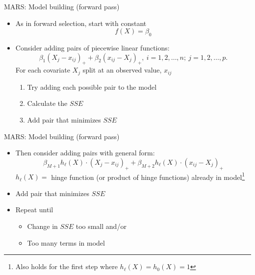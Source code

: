 \documentclass{beamer}
\begin{document}
\begin{frame}{MARS: Model building (forward pass)}
  
  \begin{itemize}[<+->]
    \item As in forward selection, start with constant
    \begin{equation*}
      f(X) = \beta_{0}
    \end{equation*}
    \item Consider adding pairs of piecewise linear functions:
  \begin{equation*}
  \beta_{1} (X_{j} - x_{ij})_{+} + \beta_{2}(x_{ij} - X_{j})_{+}, \ i = 1, 2, \ldots, n; \ j = 1, 2, \ldots, p.
  \end{equation*}
   For each covariate $X_{j}$ split at an observed value, $x_{ij}$
  \begin{enumerate}
    \item Try adding each possible pair to the model
    \item Calculate the $SSE$
    \item Add pair that minimizes $SSE$
  \end{enumerate}
  \end{itemize}

\end{frame}

\begin{frame}{MARS: Model building (forward pass)}
  \begin{itemize}[<+->]
    \item Then consider adding pairs with general form:
  \begin{equation*} \label{eq:gen-pairs-add}
    \beta_{M + 1} h_{\ell}(X) \cdot (X_{j} - x_{ij})_{+} + \beta_{M + 2} h_{\ell}(X) \cdot (x_{ij} - X_{j})_{+}
  \end{equation*}
  $h_{\ell}(X) = $ hinge function (or product of hinge functions) already in model\footnote{Also holds for the first step where $h_{\ell}(X) = h_{0}(X) = 1$}
  \item Add pair that minimizes $SSE$
  \item Repeat until 
  \begin{itemize}
    \item Change in $SSE$ too small and/or
    \item Too many terms in model
  \end{itemize}
  \end{itemize}
\end{frame}
\end{document}
